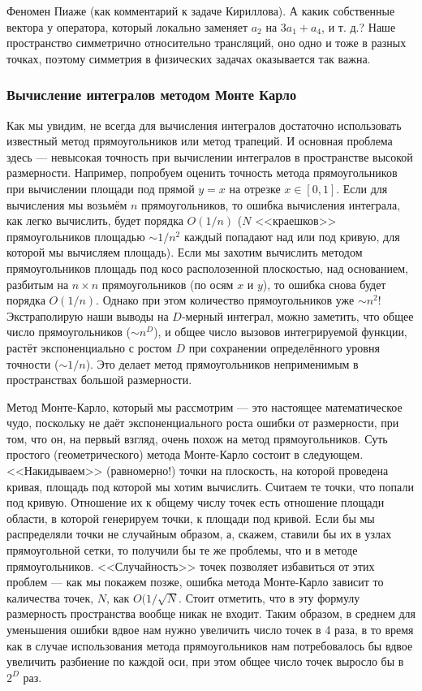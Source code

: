 \documentclass{book}
\begin{document}
Феномен Пиаже (как комментарий к задаче Кириллова). А какик собственные вектора у оператора,
который локально заменяет $a_2$ на $3 a_1 + a_4$, и т. д.? Наше пространство симметрично
относительно трансляций, оно одно и тоже в разных точках, поэтому симметрия в физических задачах
оказывается так важна.

\subsubsection{Вычисление интегралов методом Монте Карло}

Как мы увидим, не всегда для вычисления интегралов достаточно использовать известный метод
прямоугольников или метод трапеций. И основная проблема здесь --- невысокая точность при вычислении
интегралов в пространстве высокой размерности. Например, попробуем оценить точность метода
прямоугольников при вычислении площади под прямой $y = x$ на отрезке $x \in [0, 1]$. Если для
вычисления мы возьмём $n$ прямоугольников, то ошибка вычисления интеграла, как легко вычислить,
будет порядка $O(1/n)$ ($N$ <<краешков>> прямоугольников площадью $\sim 1/n^2$ каждый попадают над
или под кривую, для которой мы вычисляем площадь). Если мы захотим вычислить методом
прямоугольников площадь под косо располозенной плоскостью, над основанием, разбитым на $n \times n$
прямоугольников (по осям $x$ и $y$), то ошибка снова будет порядка $O(1/n)$. Однако при этом
количество прямоугольников уже $\sim n^2$! Экстраполирую наши выводы на $D$-мерный интеграл, можно
заметить, что общее число прямоугольников ($\sim n^D$), и общее число вызовов интегрируемой
функции, растёт экспоненциально с ростом $D$ при сохранении определённого уровня точности ($\sim
1/n$). Это делает метод прямоугольников неприменимым в пространствах большой размерности.

Метод Монте-Карло, который мы рассмотрим --- это настоящее математическое чудо, поскольку не даёт
экспоненциального роста ошибки от размерности, при том, что он, на первый взгляд, очень похож на
метод прямоугольников. Суть простого (геометрического) метода Монте-Карло состоит в следующем.
<<Накидываем>> (равномерно!) точки на плоскость, на которой проведена кривая, площадь под которой
мы хотим вычислить. Считаем те точки, что попали под кривую. Отношение их к общему числу точек есть
отношение площади области, в которой генерируем точки, к площади под кривой. Если бы мы
распределяли точки не случайным образом, а, скажем, ставили бы их в узлах прямоугольной сетки, то
получили бы те же проблемы, что и в методе прямоугольников.  <<Случайность>> точек позволяет
избавиться от этих проблем --- как мы покажем позже, ошибка метода Монте-Карло зависит то
каличества точек, $N$, как $O(1/\sqrt{N}$. Стоит отметить, что в эту формулу размерность
пространства вообще никак не входит. Таким образом, в среднем для уменьшения ошибки вдвое нам нужно
увеличить число точек в 4 раза, в то время как в случае использования метода прямоугольников нам
потребовалось бы вдвое увеличить разбиение по каждой оси, при этом общее число точек выросло бы в
$2^D$ раз.
\end{document}
